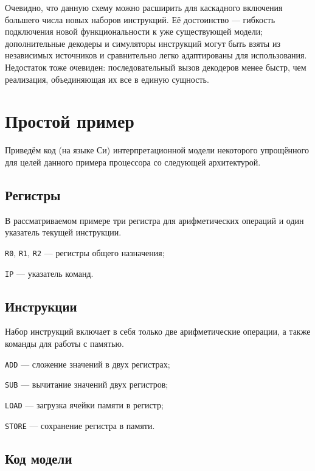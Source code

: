 Очевидно, что данную схему можно расширить для каскадного включения большего числа новых наборов инструкций. Её достоинство --- гибкость подключения новой функциональности к уже существующей модели; дополнительные декодеры и симуляторы инструкций могут быть взяты из независимых источников и сравнительно легко адаптированы для использования. Недостаток тоже очевиден: последовательный вызов декодеров менее быстр, чем реализация, объединяющая их все в единую сущность.

\section{Простой пример}

Приведём код (на языке Си) интерпретационной модели некоторого упрощённого для целей данного примера процессора со следующей архитектурой.

\subsection{Регистры}

В рассматриваемом примере три регистра для арифметических операций и один указатель текущей инструкции.
\begin{itemize*}
\item    \texttt{R0}, \texttt{R1}, \texttt{R2} --- регистры общего назначения;
\item    \texttt{IP} --- указатель команд.
\end{itemize*}

\subsection{Инструкции}

Набор инструкций включает в себя только две арифметические операции, а также команды для работы с памятью.

\begin{itemize*}
    \item \texttt{ADD} --- сложение значений в двух регистрах;
    \item \texttt{SUB} --- вычитание значений двух регистров;
    \item \texttt{LOAD} --- загрузка ячейки памяти в регистр;
    \item \texttt{STORE} --- сохранение регистра в памяти.
\end{itemize*}

\subsection{Код модели}

